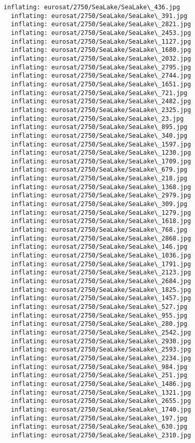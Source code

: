 \documentclass[11pt]{article}
\begin{document}
\begin{Verbatim}[commandchars=\\\{\}]
  inflating: eurosat/2750/SeaLake/SeaLake\_436.jpg
  inflating: eurosat/2750/SeaLake/SeaLake\_391.jpg
  inflating: eurosat/2750/SeaLake/SeaLake\_2821.jpg
  inflating: eurosat/2750/SeaLake/SeaLake\_2453.jpg
  inflating: eurosat/2750/SeaLake/SeaLake\_1127.jpg
  inflating: eurosat/2750/SeaLake/SeaLake\_1680.jpg
  inflating: eurosat/2750/SeaLake/SeaLake\_2032.jpg
  inflating: eurosat/2750/SeaLake/SeaLake\_2795.jpg
  inflating: eurosat/2750/SeaLake/SeaLake\_2744.jpg
  inflating: eurosat/2750/SeaLake/SeaLake\_1651.jpg
  inflating: eurosat/2750/SeaLake/SeaLake\_721.jpg
  inflating: eurosat/2750/SeaLake/SeaLake\_2482.jpg
  inflating: eurosat/2750/SeaLake/SeaLake\_2325.jpg
  inflating: eurosat/2750/SeaLake/SeaLake\_23.jpg
  inflating: eurosat/2750/SeaLake/SeaLake\_895.jpg
  inflating: eurosat/2750/SeaLake/SeaLake\_340.jpg
  inflating: eurosat/2750/SeaLake/SeaLake\_1597.jpg
  inflating: eurosat/2750/SeaLake/SeaLake\_1230.jpg
  inflating: eurosat/2750/SeaLake/SeaLake\_1709.jpg
  inflating: eurosat/2750/SeaLake/SeaLake\_679.jpg
  inflating: eurosat/2750/SeaLake/SeaLake\_218.jpg
  inflating: eurosat/2750/SeaLake/SeaLake\_1368.jpg
  inflating: eurosat/2750/SeaLake/SeaLake\_2979.jpg
  inflating: eurosat/2750/SeaLake/SeaLake\_309.jpg
  inflating: eurosat/2750/SeaLake/SeaLake\_1279.jpg
  inflating: eurosat/2750/SeaLake/SeaLake\_1618.jpg
  inflating: eurosat/2750/SeaLake/SeaLake\_768.jpg
  inflating: eurosat/2750/SeaLake/SeaLake\_2868.jpg
  inflating: eurosat/2750/SeaLake/SeaLake\_146.jpg
  inflating: eurosat/2750/SeaLake/SeaLake\_1036.jpg
  inflating: eurosat/2750/SeaLake/SeaLake\_1791.jpg
  inflating: eurosat/2750/SeaLake/SeaLake\_2123.jpg
  inflating: eurosat/2750/SeaLake/SeaLake\_2684.jpg
  inflating: eurosat/2750/SeaLake/SeaLake\_1825.jpg
  inflating: eurosat/2750/SeaLake/SeaLake\_1457.jpg
  inflating: eurosat/2750/SeaLake/SeaLake\_527.jpg
  inflating: eurosat/2750/SeaLake/SeaLake\_955.jpg
  inflating: eurosat/2750/SeaLake/SeaLake\_280.jpg
  inflating: eurosat/2750/SeaLake/SeaLake\_2542.jpg
  inflating: eurosat/2750/SeaLake/SeaLake\_2930.jpg
  inflating: eurosat/2750/SeaLake/SeaLake\_2593.jpg
  inflating: eurosat/2750/SeaLake/SeaLake\_2234.jpg
  inflating: eurosat/2750/SeaLake/SeaLake\_984.jpg
  inflating: eurosat/2750/SeaLake/SeaLake\_251.jpg
  inflating: eurosat/2750/SeaLake/SeaLake\_1486.jpg
  inflating: eurosat/2750/SeaLake/SeaLake\_1321.jpg
  inflating: eurosat/2750/SeaLake/SeaLake\_2655.jpg
  inflating: eurosat/2750/SeaLake/SeaLake\_1740.jpg
  inflating: eurosat/2750/SeaLake/SeaLake\_197.jpg
  inflating: eurosat/2750/SeaLake/SeaLake\_630.jpg
  inflating: eurosat/2750/SeaLake/SeaLake\_2310.jpg

\end{Verbatim}
\end{document}
